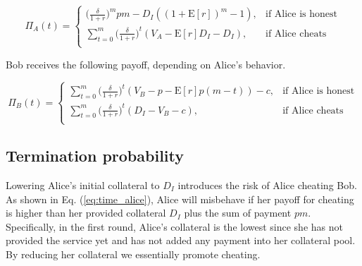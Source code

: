 \documentclass[runningheads]{llncs}
\newcommand{\dom}[1]{\todo[linecolor=green,backgroundcolor=green!25,bordercolor=green,inline,caption={}]{Comment by Dominik: #1}}
\begin{document}
\begin{equation}
\label{eq:time_alice}
\Pi_A(t) = 
\begin{cases}
    \big( \frac{\delta}{1+r} \big)^{m} pm - D_{I}((1+\mathrm{E}[r])^{m}-1), & \text{if Alice is honest} \\
    \sum_{t=0}^{m} \big( \frac{\delta}{1+r} \big)^{t} (V_A - \mathrm{E}[r]D_{I}-D_{I}), & \text{if Alice cheats} \\
\end{cases}
\end{equation}




Bob receives the following payoff, depending on Alice's behavior.

\begin{equation}
\label{eq:time_bob}
\Pi_B (t) = 
\begin{cases}
\sum_{t=0}^{m} \big( \frac{\delta}{1+r} \big)^t (V_B - p - \mathrm{E}[r]p(m-t)) - c, & \text{if Alice is honest} \\
\sum_{t=0}^{m} \big( \frac{\delta}{1+r} \big)^t (D_{I} -V_B -c) , & \text{if Alice cheats} \\
\end{cases}
\end{equation}


\subsection{Termination probability}
Lowering Alice's initial collateral to $D_I$ introduces the risk of Alice cheating Bob.
As shown in Eq. (\ref{eq:time_alice}), Alice will misbehave if her payoff for cheating is higher than her provided collateral $D_I$ plus the sum of payment $pm$.
Specifically, in the first round, Alice's collateral is the lowest since she has not provided the service yet and has not added any payment into her collateral pool.
By reducing her collateral we essentially promote cheating.
\end{document}
